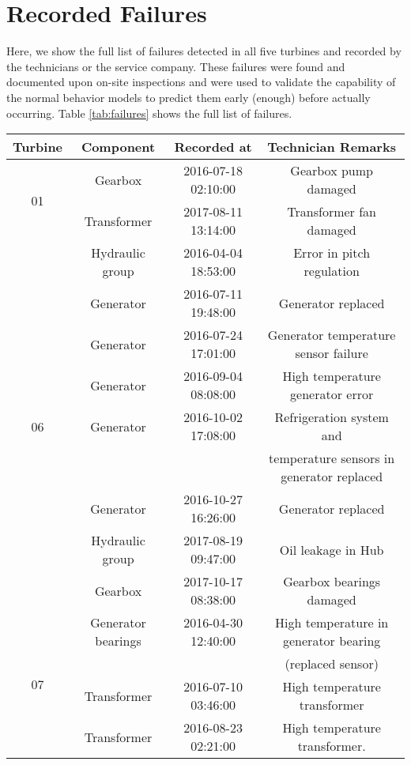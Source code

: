 \chapter{Recorded Failures}
\label{chap:appendix2}
Here, we show the full list of failures detected in all five turbines and recorded by the technicians or the service company.
These failures were found and documented upon on-site inspections and were used to validate the capability of the normal behavior models to 
predict them early (enough) before actually occurring. Table \ref{tab:failures} shows the full list of failures.

\begin{table}[h]
    \centering
    \begin{tabular}{|c|c|c|c|}
    \hline
    \textbf{Turbine} & \textbf{Component} & \textbf{Recorded at} & \textbf{Technician Remarks} \\
    \hline
    \multirow{2}{*}{01} & Gearbox & 2016-07-18 02:10:00 & Gearbox pump damaged \\
    & Transformer & 2017-08-11 13:14:00 & Transformer fan damaged \\
    \hline
    \multirow{9}{*}{06} & Hydraulic group & 2016-04-04 18:53:00 & Error in pitch regulation \\
    & Generator & 2016-07-11 19:48:00 & Generator replaced \\
    & Generator & 2016-07-24 17:01:00 & Generator temperature sensor failure \\
    & Generator & 2016-09-04 08:08:00 & High temperature generator error \\
    & Generator & 2016-10-02 17:08:00 & Refrigeration system and \\
    & & & temperature sensors in generator replaced \\
    & Generator & 2016-10-27 16:26:00 & Generator replaced \\
    & Hydraulic group & 2017-08-19 09:47:00 & Oil leakage in Hub \\
    & Gearbox & 2017-10-17 08:38:00 & Gearbox bearings damaged \\
    \hline
    \multirow{9}{*}{07} & Generator bearings & 2016-04-30 12:40:00 & High temperature in generator bearing \\
    & & & (replaced sensor) \\
    & Transformer & 2016-07-10 03:46:00 & High temperature transformer \\
    & Transformer & 2016-08-23 02:21:00 & High temperature transformer. \\

\end{tabular}
\end{table}
